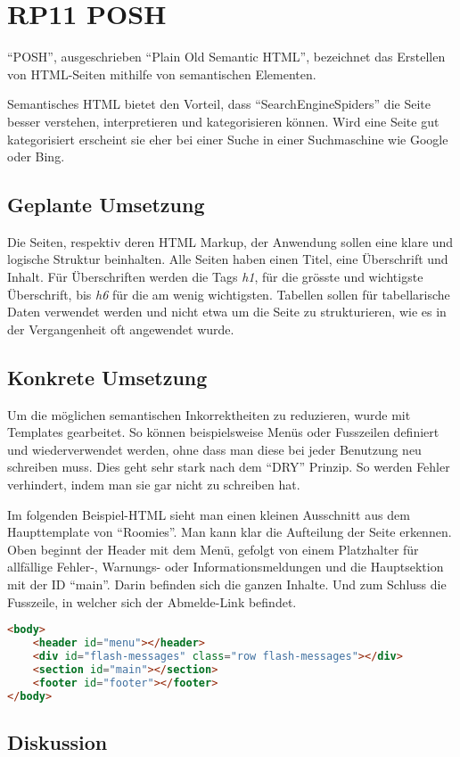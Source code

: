 \section{RP11 POSH}
\label{sec:principle-rp11-posh}

``POSH'', ausgeschrieben ``Plain Old Semantic HTML'', bezeichnet das Erstellen von HTML-Seiten mithilfe von semantischen Elementen. \cite{SemanticHTML}

Semantisches HTML bietet den Vorteil, dass ``\glspl{SearchEngineSpider}'' die Seite besser verstehen, interpretieren und kategorisieren können. Wird eine Seite gut kategorisiert erscheint sie eher bei einer Suche in einer Suchmaschine wie Google oder Bing.

\subsection*{Geplante Umsetzung}
Die Seiten, respektiv deren HTML Markup, der Anwendung sollen eine klare und logische Struktur beinhalten.
Alle Seiten haben einen Titel, eine Überschrift und Inhalt.
Für Überschriften werden die Tags \emph{h1}, für die grösste und wichtigste Überschrift, bis \emph{h6} für die am wenig wichtigsten.
Tabellen sollen für tabellarische Daten verwendet werden und nicht etwa um die Seite zu strukturieren, wie es in der Vergangenheit oft angewendet wurde.

\subsection*{Konkrete Umsetzung}
Um die möglichen semantischen Inkorrektheiten zu reduzieren, wurde mit Templates gearbeitet. So können beispielsweise Menüs oder Fusszeilen definiert und wiederverwendet werden, ohne dass man diese bei jeder Benutzung neu schreiben muss. Dies geht sehr stark nach dem ``\gls{DRY}'' Prinzip. So werden Fehler verhindert, indem man sie gar nicht zu schreiben hat.

Im folgenden Beispiel-HTML sieht man einen kleinen Ausschnitt aus dem Haupttemplate von ``Roomies''. Man kann klar die Aufteilung der Seite erkennen. Oben beginnt der Header mit dem Menü, gefolgt von einem Platzhalter für allfällige Fehler-, Warnungs- oder Informationsmeldungen und die Hauptsektion mit der ID ``main''. Darin befinden sich die ganzen Inhalte. Und zum Schluss die Fusszeile, in welcher sich der Abmelde-Link befindet.

\begin{lstlisting}[language=HTML, caption=Layout Definition \cite{roomiesHtmlSkeleton}, label=lst:layoutDefinition, firstnumber=27]
<body>
	<header id="menu"></header>
	<div id="flash-messages" class="row flash-messages"></div>
	<section id="main"></section>
	<footer id="footer"></footer>
</body>
\end{lstlisting}

\subsection*{Diskussion}
